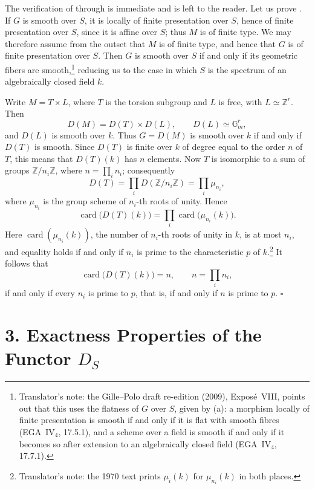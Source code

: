 The verification of 
through  is immediate
and is left to the reader. Let us prove
. If \(G\) is smooth
over \(S\), it is locally of finite presentation over \(S\), hence of
finite presentation over \(S\), since it is affine over \(S\); thus \(M\)
is of finite type. We may therefore assume from the outset that \(M\) is
of finite type, and hence that \(G\) is of finite presentation over
\(S\). Then
\(G\) is smooth over \(S\) if and only if its geometric fibers are
smooth,\footnote{Translator's note: the Gille--Polo draft re-edition (2009), Expos\'e~VIII, points
out that this uses the flatness of \(G\) over \(S\), given by (a): a morphism locally of finite
presentation is smooth if and only if it is flat with smooth fibres (EGA~IV\(_4\), 17.5.1), and a
scheme over a field is smooth if and only if it becomes so after extension to an algebraically closed
field (EGA~IV\(_4\), 17.7.1).} reducing us to the case in which \(S\) is the spectrum of an
algebraically closed field \(k\).

Write \(M=T\times L\), where \(T\) is the torsion subgroup and \(L\) is
free, with \(L\simeq\mathbb Z^r\). Then
\[
  D(M)=D(T)\times D(L),
  \qquad
  D(L)\simeq\mathbb G_m^r,
\]
and \(D(L)\) is smooth over \(k\). Thus \(G=D(M)\) is smooth over \(k\)
if and only if \(D(T)\) is smooth. Since \(D(T)\) is finite over \(k\) of
degree equal to the order \(n\) of \(T\), this means that \(D(T)(k)\) has
\(n\) elements. Now \(T\) is isomorphic to a sum of groups
\(\mathbb Z/n_i\mathbb Z\), where \(n=\prod_i n_i\); consequently
\[
  D(T)=\prod_iD(\mathbb Z/n_i\mathbb Z)
      =\prod_i\mu_{n_i},
\]
where \(\mu_{n_i}\) is the group scheme of \(n_i\)-th roots of unity.
Hence
\[
  \operatorname{card}\bigl(D(T)(k)\bigr)
  =\prod_i\operatorname{card}\bigl(\mu_{n_i}(k)\bigr).
\]
Here \(\operatorname{card}(\mu_{n_i}(k))\), the number of \(n_i\)-th
roots of unity in \(k\), is at most \(n_i\), and equality holds if and
only if \(n_i\) is prime to the characteristic \(p\) of \(k\).\footnote{Translator's note: the
1970 text prints \(\mu_i(k)\) for \(\mu_{n_i}(k)\) in both places.}
It follows
that
\[
  \operatorname{card}\bigl(D(T)(k)\bigr)=n,
  \qquad n=\prod_i n_i,
\]
if and only if every \(n_i\) is prime to \(p\), that is, if and only if
\(n\) is prime to \(p\).
\hfill\(\square\)

\section*{3. Exactness Properties of the Functor
\texorpdfstring{\(D_S\)}{D\_S}}

